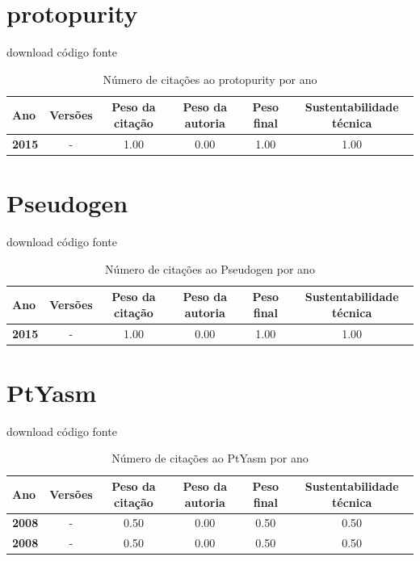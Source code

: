 \section{protopurity}
\checkmark download
\checkmark código fonte


\begin{table}[H]
\caption{Número de citações ao protopurity por ano}
\centering
\begin{tabular}{| l | c | c | c | c | c |}
  \hline
  Ano & Versões & Peso da citação & Peso da autoria & Peso final & Sustentabilidade técnica \\
  \hline
            {\bf 2015}
          &
          -
          &
          1.00
          &
          0.00
          &
          1.00
          &
            {\color{blue} 1.00}
          \\
\hline
\end{tabular}
\end{table}



\section{Pseudogen}
\checkmark download
\checkmark código fonte


\begin{table}[H]
\caption{Número de citações ao Pseudogen por ano}
\centering
\begin{tabular}{| l | c | c | c | c | c |}
  \hline
  Ano & Versões & Peso da citação & Peso da autoria & Peso final & Sustentabilidade técnica \\
  \hline
            {\bf 2015}
          &
          -
          &
          1.00
          &
          0.00
          &
          1.00
          &
            {\color{blue} 1.00}
          \\
\hline
\end{tabular}
\end{table}



\section{PtYasm}
\checkmark download
\checkmark código fonte


\begin{table}[H]
\caption{Número de citações ao PtYasm por ano}
\centering
\begin{tabular}{| l | c | c | c | c | c |}
  \hline
  Ano & Versões & Peso da citação & Peso da autoria & Peso final & Sustentabilidade técnica \\
  \hline
            {\bf 2008}
          &
          -
          &
          0.50
          &
          0.00
          &
          0.50
          &
            {\color{blue} 0.50}
          \\
            {\bf 2008}
          &
          -
          &
          0.50
          &
          0.00
          &
          0.50
          &
            {\color{blue} 0.50}
          \\
\hline
\end{tabular}
\end{table}



